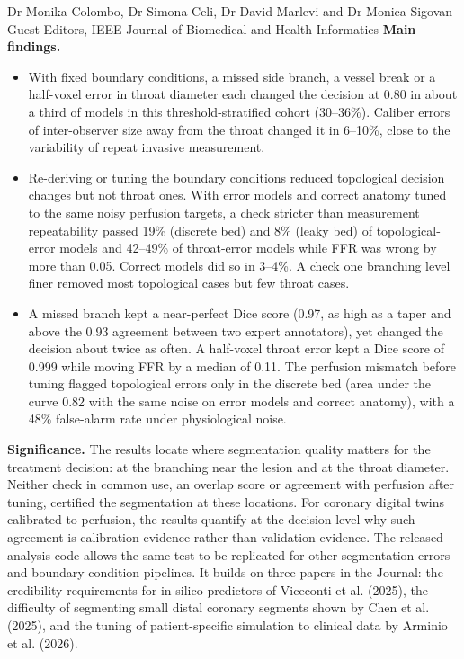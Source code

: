 \documentclass[10pt]{letter}
\begin{document}
\begin{letter}{Dr Monika Colombo, Dr Simona Celi, Dr David Marlevi and Dr Monica Sigovan\\Guest Editors, IEEE Journal of Biomedical and Health Informatics}
\textbf{Main findings.}
\begin{itemize}[nosep,leftmargin=1.2em]
\item With fixed boundary conditions, a missed side branch, a vessel break or a half-voxel error in throat diameter each changed the decision at 0.80 in about a third of models in this threshold-stratified cohort (30--36\%). Caliber errors of inter-observer size away from the throat changed it in 6--10\%, close to the variability of repeat invasive measurement.
\item Re-deriving or tuning the boundary conditions reduced topological decision changes but not throat ones. With error models and correct anatomy tuned to the same noisy perfusion targets, a check stricter than measurement repeatability passed 19\% (discrete bed) and 8\% (leaky bed) of topological-error models and 42--49\% of throat-error models while FFR was wrong by more than 0.05. Correct models did so in 3--4\%. A check one branching level finer removed most topological cases but few throat cases.
\item A missed branch kept a near-perfect Dice score (0.97, as high as a taper and above the 0.93 agreement between two expert annotators), yet changed the decision about twice as often. A half-voxel throat error kept a Dice score of 0.999 while moving FFR by a median of 0.11. The perfusion mismatch before tuning flagged topological errors only in the discrete bed (area under the curve 0.82 with the same noise on error models and correct anatomy), with a 48\% false-alarm rate under physiological noise.
\end{itemize}

\textbf{Significance.} The results locate where segmentation quality matters for the treatment decision: at the branching near the lesion and at the throat diameter. Neither check in common use, an overlap score or agreement with perfusion after tuning, certified the segmentation at these locations. For coronary digital twins calibrated to perfusion, the results quantify at the decision level why such agreement is calibration evidence rather than validation evidence. The released analysis code allows the same test to be replicated for other segmentation errors and boundary-condition pipelines. It builds on three papers in the Journal: the credibility requirements for in silico predictors of Viceconti et al. (2025), the difficulty of segmenting small distal coronary segments shown by Chen et al. (2025), and the tuning of patient-specific simulation to clinical data by Arminio et al. (2026).


\end{letter}
\end{document}

